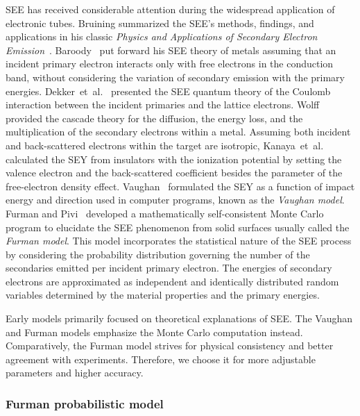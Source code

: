 SEE has received considerable attention during the widespread application of electronic tubes.
Bruining summarized the SEE's methods, findings, and applications in his classic \textit{Physics and Applications of Secondary Electron Emission}~\cite{bruining_physics_1954}.
Baroody~\cite{baroody1950theory} put forward his SEE theory of metals assuming that an incident primary
electron interacts only with free electrons in the conduction band,
without considering the variation of secondary emission with the primary energies.
Dekker~et~al.~\cite{dekker1952theory} presented the SEE quantum theory of
the Coulomb interaction between the incident primaries and the lattice electrons.
Wolff~\cite{wolff1954theory} provided the cascade theory for the diffusion, the energy loss, and the multiplication of
the secondary electrons within a metal.
Assuming both incident and back-scattered electrons within the target are isotropic,
Kanaya~et~al.~\cite{Kanaya_1978} calculated the SEY from insulators with the ionization potential
by setting the valence electron and the back-scattered coefficient
besides the parameter of the free-electron density effect.
Vaughan~\cite{vaughan} formulated the SEY
as a function of impact energy and direction used in computer programs, known as the \emph{Vaughan model}.
Furman and Pivi~\cite{2002Probabilistic} developed a mathematically self-consistent Monte Carlo program
to elucidate the SEE phenomenon from solid surfaces usually called the \emph{Furman model}.
This model incorporates the statistical nature of the SEE process
by considering the probability distribution governing the number of the secondaries emitted per incident primary electron.
The energies of secondary electrons are approximated as independent and identically distributed random variables
determined by the material properties and the primary energies.

Early models primarily focused on theoretical explanations of SEE.
The Vaughan and Furman models emphasize the Monte Carlo computation instead.
Comparatively, the Furman model strives for physical consistency and better agreement with experiments.
Therefore, we choose it for more adjustable parameters and higher accuracy.

\subsubsection{Furman probabilistic model}\label{subsec:fuman}

